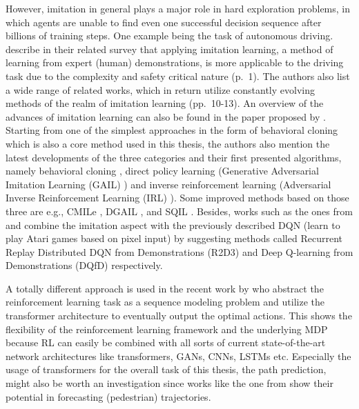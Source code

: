 However, imitation in general plays a major role in hard exploration problems, in which agents are unable to find even one successful decision sequence after billions of training steps. One example being the task of autonomous driving. \cite{le2022survey} describe in their related survey that applying imitation learning, a method of learning from expert (human) demonstrations, is more applicable to the driving task due to the complexity and safety critical nature (p.~1). The authors also list a wide range of related works, which in return utilize  constantly evolving methods of the realm of imitation learning (pp.~10-13). An overview of the advances of imitation learning can also be found in the paper proposed by \cite{zheng2021imitation}. Starting from one of the simplest approaches in the form of behavioral cloning which is also a core method used in this thesis, the authors also mention the latest developments of the three categories and their first presented algorithms, namely behavioral cloning \cite[]{alvinn}, direct policy learning (Generative Adversarial Imitation Learning (GAIL) \cite[]{ho2016generative}) and inverse reinforcement learning (Adversarial Inverse Reinforcement Learning (IRL) \cite[]{fu2017learning}). Some improved methods based on those three are e.g., CMILe \cite[]{tu2021closing}, DGAIL \cite[]{zuo2020deterministic}, and SQIL \cite[]{reddy2019sqil}. Besides, works such as the ones from \cite{paine2019making} and \cite{hester2017deep} combine the imitation aspect with the previously described DQN (learn to play Atari games based on pixel input) by suggesting methods called  Recurrent Replay Distributed DQN from Demonstrations (R2D3) and Deep Q-learning from Demonstrations (DQfD) respectively.
\par
A totally different approach is used in the recent work by \cite{chen2021decision} who abstract the reinforcement learning task as a sequence modeling problem and utilize the transformer architecture to eventually output the optimal actions. This shows the flexibility of the reinforcement learning framework and the underlying MDP because RL can easily be combined with all sorts of current state-of-the-art network architectures like transformers, GANs, CNNs, LSTMs etc. Especially the usage of transformers for the overall task of this thesis, the path prediction, might also be worth an investigation since works like the one from \cite{giuliari2021transformer} show their potential in forecasting (pedestrian) trajectories.
\par

